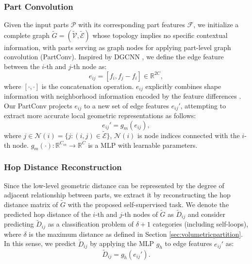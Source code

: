 \documentclass[letterpaper]{article}
\begin{document}
\subsubsection{Part Convolution}
Given the input parts \(\mathcal{P}\) with its corresponding part features \(\mathcal{F}\), we initialize a complete graph  \(\tilde{G}=(\tilde{\mathcal{V}}, \tilde{\mathcal{E}})\) whose topology implies no specific contextual information, with parts serving as graph nodes for applying part-level graph convolution (PartConv).
Inspired by DGCNN \cite{dgcnn}, we define the edge feature between the \(i\)-th and \(j\)-th node as:
\begin{equation}
e_{i j}=\left[f_{i}, f_{j}-f_{i}\right] \in \mathbb{R}^{2C},
\end{equation}
where \([\cdot, \cdot]\) is the concatenation operation.
\(e_{i j}\) explicitly combines shape information with neighborhood information encoded by the feature differences \cite{dgcnn}.
Our PartConv projects \(e_{ij}\) to a new set of edge features \(e_{ij}'\), attempting to extract more accurate local geometric representations \cite{adaptconv} as follows:
\begin{equation}
e_{i j}'=g_{m}\left(e_{ij}\right),
\end{equation}
where \(j \in \mathcal{N}(i) =\{j:(i, j) \in \tilde{\mathcal{E}}\}\), \(\mathcal{N}(i)\) is node indices connected with the \(i\)-th node.
\(g_m(\cdot): \mathbb{R}^{C_{in}} \rightarrow \mathbb{R}^{C}\) is a MLP with learnable parameters.



\subsubsection{Hop Distance Reconstruction}
Since the low-level geometric distance can be represented by the degree of adjacent relationship between parts, we extract it by reconstructing the hop distance matrix of \(\tilde{G}\) with the proposed self-supervised task.
We denote the predicted hop distance of the \(i\)-th and \(j\)-th nodes of \(\tilde{G}\) as \(\tilde{D}_{i j}\) and consider predicting \(\tilde{D}_{i j}\) as a classification problem of \(\delta + 1\) categories (including self-loops), where \(\delta\) is the maximum distance as defined in Section \ref{sec:volumetricpartition}.
In this sense, we predict \(\tilde{D}_{ij}\) by applying the MLP \(g_h\) to edge features \(e_{i j}'\) as:
\begin{equation}
\tilde{D}_{i j} = g_h(e_{i j}'). %
\end{equation}
\end{document}
